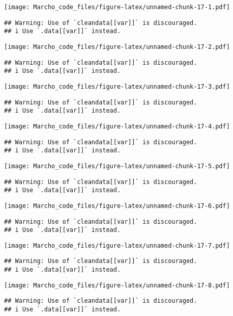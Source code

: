 \documentclass[
]{article}
\begin{document}
\texttt{[image: Marcho\_code\_files/figure-latex/unnamed-chunk-17-1.pdf]}

\begin{verbatim}
## Warning: Use of `cleandata[[var]]` is discouraged.
## i Use `.data[[var]]` instead.
\end{verbatim}

\texttt{[image: Marcho\_code\_files/figure-latex/unnamed-chunk-17-2.pdf]}

\begin{verbatim}
## Warning: Use of `cleandata[[var]]` is discouraged.
## i Use `.data[[var]]` instead.
\end{verbatim}

\texttt{[image: Marcho\_code\_files/figure-latex/unnamed-chunk-17-3.pdf]}

\begin{verbatim}
## Warning: Use of `cleandata[[var]]` is discouraged.
## i Use `.data[[var]]` instead.
\end{verbatim}

\texttt{[image: Marcho\_code\_files/figure-latex/unnamed-chunk-17-4.pdf]}

\begin{verbatim}
## Warning: Use of `cleandata[[var]]` is discouraged.
## i Use `.data[[var]]` instead.
\end{verbatim}

\texttt{[image: Marcho\_code\_files/figure-latex/unnamed-chunk-17-5.pdf]}

\begin{verbatim}
## Warning: Use of `cleandata[[var]]` is discouraged.
## i Use `.data[[var]]` instead.
\end{verbatim}

\texttt{[image: Marcho\_code\_files/figure-latex/unnamed-chunk-17-6.pdf]}

\begin{verbatim}
## Warning: Use of `cleandata[[var]]` is discouraged.
## i Use `.data[[var]]` instead.
\end{verbatim}

\texttt{[image: Marcho\_code\_files/figure-latex/unnamed-chunk-17-7.pdf]}

\begin{verbatim}
## Warning: Use of `cleandata[[var]]` is discouraged.
## i Use `.data[[var]]` instead.
\end{verbatim}

\texttt{[image: Marcho\_code\_files/figure-latex/unnamed-chunk-17-8.pdf]}

\begin{verbatim}
## Warning: Use of `cleandata[[var]]` is discouraged.
## i Use `.data[[var]]` instead.
\end{verbatim}
\end{document}

